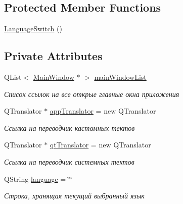 \subsection*{Protected Member Functions}
\begin{DoxyCompactItemize}
\item 
\mbox{\hyperlink{class_language_switch_aaaf776c062ae2690092a674e7e5efdd1}{Language\+Switch}} ()
\end{DoxyCompactItemize}
\subsection*{Private Attributes}
\begin{DoxyCompactItemize}
\item 
\mbox{\label{class_language_switch_a81714c79a3e66c0b03a604c902ab1468}} 
Q\+List$<$ \mbox{\hyperlink{class_main_window}{Main\+Window}} $\ast$ $>$ \mbox{\hyperlink{class_language_switch_a81714c79a3e66c0b03a604c902ab1468}{main\+Window\+List}}
\begin{DoxyCompactList}\small\item\em Список ссылок на все открые главные окна приложения \end{DoxyCompactList}\item 
\mbox{\label{class_language_switch_a20df782a6386d477928869260ede6f96}} 
Q\+Translator $\ast$ \mbox{\hyperlink{class_language_switch_a20df782a6386d477928869260ede6f96}{app\+Translator}} = new Q\+Translator
\begin{DoxyCompactList}\small\item\em Ссылка на переводчик кастомных тектов \end{DoxyCompactList}\item 
\mbox{\label{class_language_switch_a32c94910eaaaa28182afc3031191453f}} 
Q\+Translator $\ast$ \mbox{\hyperlink{class_language_switch_a32c94910eaaaa28182afc3031191453f}{qt\+Translator}} = new Q\+Translator
\begin{DoxyCompactList}\small\item\em Ссылка на переводчик системных тектов \end{DoxyCompactList}\item 
\mbox{\label{class_language_switch_ac1923f713ef436d6eb797a023c0382c0}} 
Q\+String \mbox{\hyperlink{class_language_switch_ac1923f713ef436d6eb797a023c0382c0}{language}} = \char`\"{}\char`\"{}
\begin{DoxyCompactList}\small\item\em Строка, хранящая текущий выбранный язык \end{DoxyCompactList}\end{DoxyCompactItemize}
